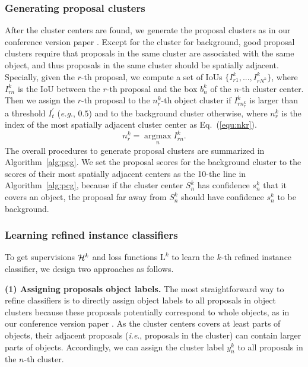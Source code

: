 \documentclass[10pt,journal,compsoc]{IEEEtran}
\DeclareMathOperator*{\argmax}{argmax}
\def\eg{\emph{e.g}.} \def\Eg{\emph{E.g}.}
\def\ie{\emph{i.e}.} \def\Ie{\emph{I.e}.}
\begin{document}
\subsubsection{Generating proposal clusters}
\label{sec:pcg}

After the cluster centers are found,
we generate the proposal clusters as in our conference version paper \cite{Ref:Tang2017multiple}.
Except for the cluster for background,
good proposal clusters require that proposals in the same cluster are associated with the same object,
and thus proposals in the same cluster should be spatially adjacent.
Specially, given the $r$-th proposal,
we compute a set of IoUs $\{I^{k}_{r1}, ..., I^{k}_{rN^{k}}\}$,
where $I^{k}_{rn}$ is the IoU between the $r$-th proposal and the box $b^{k}_{n}$ of the $n$-th cluster center.
Then we assign the $r$-th proposal to the $n^{k}_{r}$-th object cluster if $I^{k}_{rn^{k}_{r}}$ is larger than a threshold $I^{\prime}_{t}$ (\eg, $0.5$)
and to the background cluster otherwise,
where $n^{k}_{r}$ is the index of the most spatially adjacent cluster center as Eq.~(\ref{equ:nkr}).
\begin{equation}
\label{equ:nkr}
    n^{k}_{r} = \mathop{\argmax}\limits_{n} I^{k}_{rn}.
\end{equation}
The overall procedures to generate proposal clusters are summarized in Algorithm~\ref{alg:pcg}.
We set the proposal scores for the background cluster to the scores of their most spatially adjacent centers as the 10-the line in Algorithm~\ref{alg:pcg},
because if the cluster center $S^{k}_{n}$ has confidence $s^{k}_{n}$ that it covers an object,
the proposal far away from $S^{k}_{n}$ should have confidence $s^{k}_{n}$ to be background.



\subsubsection{Learning refined instance classifiers}
\label{sec:lric}

To get supervisions ${\cal H}^{k}$ and loss functions $\mathrm{L}^{k}$ to learn the $k$-th refined instance classifier,
we design two approaches as follows.


\vspace{0.1cm}
\noindent\textbf{(1) Assigning proposals object labels.}
The most straightforward way to refine classifiers is to directly assign object labels to all proposals in object clusters because these proposals potentially correspond to whole objects,
as in our conference version paper \cite{Ref:Tang2017multiple}.
As the cluster centers covers at least parts of objects,
their adjacent proposals (\ie, proposals in the cluster) can contain larger parts of objects.
Accordingly, we can assign the cluster label $y^{k}_{n}$ to all proposals in the $n$-th cluster.
\end{document}
